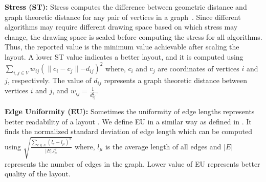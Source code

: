 \documentclass{vgtc}
\begin{document}

{\bf Stress (ST): }
Stress computes the difference between geometric distance and graph theoretic distance for any pair of vertices in a graph~\cite{brandes2008experimental,de2019multi}. Since different algorithms may require different drawing space based on which stress may change, the drawing space is scaled before computing the stress for all algorithms. Thus, the reported value is the minimum value achievable after scaling the layout. A lower ST value indicates a better layout, and it is computed using $\sum_{i,j\in V} w_{ij}(\parallel c_i - c_j\parallel - d_{ij})^2$ where, $c_i$ and $c_j$ are coordinates of vertices $i$ and $j$, respectively. The value of $d_{ij}$ represents a graph theoretic distance between vertices $i$ and $j$, and $w_{ij} = \frac{1}{d_{ij}^2}$.




{\bf Edge Uniformity (EU):}
\label{subsec:uel}
Sometimes the uniformity of edge lengths represents better readability of a layout \cite{huang2007effects}. We define EU in a similar way as defined in \cite{hachul2007large,de2019multi}. It finds the normalized standard deviation of edge length which can be computed using $\sqrt{\frac{\sum_{e\in E}(l_e - l_{\mu})^2}{|E|.l_{\mu}^2}}$ where, $l_{\mu}$ is the average length of all edges and $|E|$ represents the number of edges in the graph. Lower value of EU represents better quality of the layout.
\end{document}
